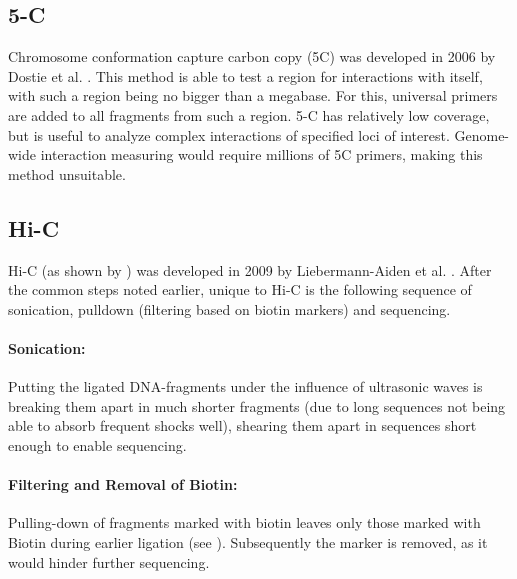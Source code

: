 \subsection{5-C}\label{sec:5C}

Chromosome conformation capture carbon copy (5C) was developed in 2006 by
Dostie et al. \cite{dostie2006chromosome}. This method is able to test a region
for interactions with itself, with such a region being no bigger than a
megabase. For this, universal primers are added to all fragments from such a
region. 5-C has relatively low coverage, but is useful to analyze complex
interactions of specified loci of interest. Genome-wide interaction measuring
would require millions of 5C primers, making this method unsuitable.


\newpage




\subsection{Hi-C}\label{sec:HiC}

Hi-C (as shown by ) was developed in 2009 by Liebermann-Aiden et al.
\cite{lieberman2009comprehensive}. After the common steps noted earlier, unique
to Hi-C is the following sequence of sonication, pulldown (filtering based on
biotin markers) and sequencing.






\paragraph{Sonication:}\label{sec:sonication}
Putting the ligated DNA-fragments under the influence of ultrasonic waves is
breaking them apart in much shorter fragments (due to long sequences not being
able to absorb frequent shocks well), shearing them apart in sequences short
enough to enable sequencing.


\paragraph{Filtering and Removal of Biotin:}\label{sec:pulldown}
Pulling-down of fragments marked with biotin leaves only those marked with
Biotin during earlier ligation (see ). Subsequently the
marker is removed, as it would hinder further sequencing.


